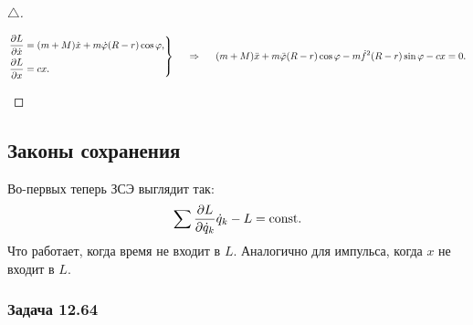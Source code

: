 \begin{proof}[$\triangle$]
\begin{minipage}[t]{0.9\textwidth}
\begin{enumerate}[label = \Roman*.]
\begin{equation*}
                \left.\begin{aligned}
                \frac{\partial L}{\partial \dot{x}} &= (m+M) \dot{x} + m \dot{\varphi} (R-r) \cos \varphi, \\
                \frac{\partial L}{\partial x} &= cx. \\
            \end{aligned}\right\}
            \hspace{0.5cm} \Rightarrow \hspace{0.5cm} 
            (m+M) \ddot{x} + m \ddot{\varphi} (R-r) \cos \varphi - m \dot{f}^2 (R-r) \sin \varphi - cx = 0.
\end{equation*}
        \end{enumerate}
    \end{minipage}

\phantom{42}
\end{proof}


\subsection{\xmark Законы сохранения}
Во-первых теперь ЗСЭ выглядит так:
\begin{equation}
    \sum \frac{\partial L}{\partial \dot{q}_k} \dot{q}_k - L = \text{const}.
\end{equation}
Что работает, когда время не входит в $L$. Аналогично для импульса, когда $x$ не входит в $L$.

\subsubsection*{Задача 12.64}

